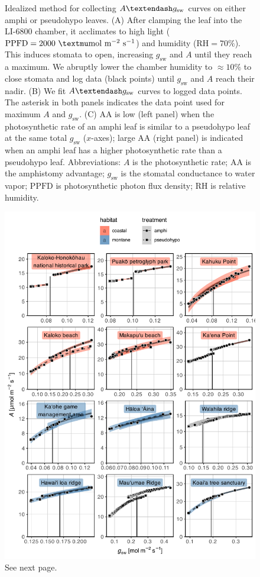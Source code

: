 \documentclass[
  letterpaper,
  DIV=11,
  numbers=noendperiod]{scrartcl}
\begin{document}
\begin{figure}
  \caption{Idealized method for collecting $A \textendash g_\text{sw}$ curves on either amphi or pseudohypo leaves. (A) After clamping the leaf into the LI-6800 chamber, it acclimates to high light ($\mathrm{PPFD} = 2000~\textmu \text{mol}~\text{m}^{-2}~\text{s}^{-1}$) and humidity ($\mathrm{RH} = 70\%$). This induces stomata to open, increasing $g_\mathrm{sw}$ and $A$ until they reach a maximum. We abruptly lower the chamber humidity to $\approx 10\%$ to close stomata and log data (black points) until $g_\mathrm{sw}$ and $A$ reach their nadir. (B) We fit $A \textendash g_\text{sw}$ curves to logged data points. The asterisk in both panels indicates the data point used for maximum $A$ and $g_\mathrm{sw}$. (C) $\mathrm{AA}$ is low (left panel) when the photosynthetic rate of an amphi leaf is similar to a pseudohypo leaf at the same total $g_\mathrm{sw}$ ($x$-axes); large $\mathrm{AA}$ (right panel) is indicated when an amphi leaf has a higher photosynthetic rate than a pseudohypo leaf. Abbreviations: $A$ is the photosynthetic rate; $\mathrm{AA}$ is the amphistomy advantage; $g_\mathrm{sw}$ is the stomatal conductance to water vapor; $\mathrm{PPFD}$ is photosynthetic photon flux density; $\mathrm{RH}$ is relative humidity.}
  \label{fig:ags-curve}
\end{figure}

\newpage

\begin{figure}
  \includegraphics{../figures/licor.pdf}
  \caption{See next page.}
  \label{fig:licor}
\end{figure}
\end{document}
